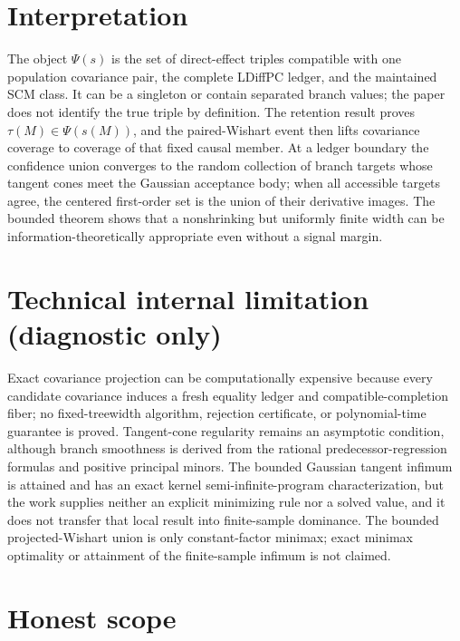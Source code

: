 \documentclass{article}
\begin{document}
\section{Interpretation}

The object \(\Psi(s)\) is the set of direct-effect triples compatible with one population covariance pair, the complete LDiffPC ledger, and the maintained SCM class. It can be a singleton or contain separated branch values; the paper does not identify the true triple by definition. The retention result proves \(\tau(M)\in\Psi(s(M))\), and the paired-Wishart event then lifts covariance coverage to coverage of that fixed causal member. At a ledger boundary the confidence union converges to the random collection of branch targets whose tangent cones meet the Gaussian acceptance body; when all accessible targets agree, the centered first-order set is the union of their derivative images. The bounded theorem shows that a nonshrinking but uniformly finite width can be information-theoretically appropriate even without a signal margin.

\section*{Technical internal limitation (diagnostic only)}

Exact covariance projection can be computationally expensive because every candidate covariance induces a fresh equality ledger and compatible-completion fiber; no fixed-treewidth algorithm, rejection certificate, or polynomial-time guarantee is proved. Tangent-cone regularity remains an asymptotic condition, although branch smoothness is derived from the rational predecessor-regression formulas and positive principal minors. The bounded Gaussian tangent infimum is attained and has an exact kernel semi-infinite-program characterization, but the work supplies neither an explicit minimizing rule nor a solved value, and it does not transfer that local result into finite-sample dominance. The bounded projected-Wishart union is only constant-factor minimax; exact minimax optimality or attainment of the finite-sample infimum is not claimed.

\section{Honest scope}
\end{document}
